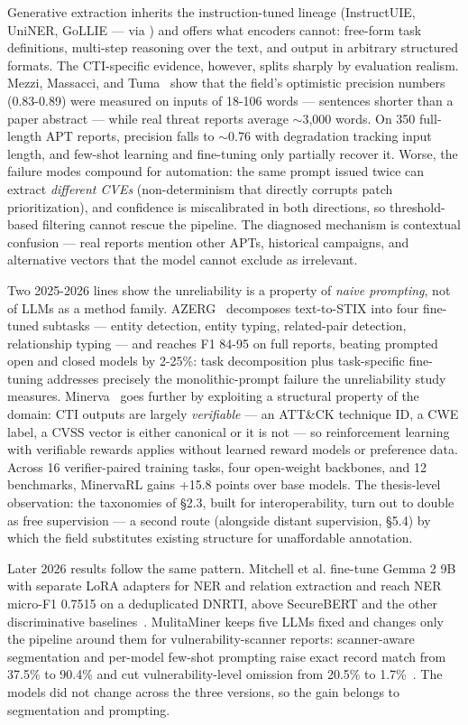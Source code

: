 \documentclass[11pt]{article}
\begin{document}
Generative extraction inherits the instruction-tuned lineage (InstructUIE, UniNER, GoLLIE — via \citealp{zaratiana2023gliner}) and offers what encoders cannot: free-form task definitions, multi-step reasoning over the text, and output in arbitrary structured formats. The CTI-specific evidence, however, splits sharply by evaluation realism. Mezzi, Massacci, and Tuma~\citep{mezzi2025large} show that the field's optimistic precision numbers (0.83-0.89) were measured on inputs of 18-106 words — sentences shorter than a paper abstract — while real threat reports average $\sim$3,000 words. On 350 full-length APT reports, precision falls to $\sim$0.76 with degradation tracking input length, and few-shot learning and fine-tuning only partially recover it. Worse, the failure modes compound for automation: the same prompt issued twice can extract \emph{different CVEs} (non-determinism that directly corrupts patch prioritization), and confidence is miscalibrated in both directions, so threshold-based filtering cannot rescue the pipeline. The diagnosed mechanism is contextual confusion — real reports mention other APTs, historical campaigns, and alternative vectors that the model cannot exclude as irrelevant.

Two 2025-2026 lines show the unreliability is a property of \emph{naive prompting}, not of LLMs as a method family. AZERG~\citep{lekssays2025text} decomposes text-to-STIX into four fine-tuned subtasks — entity detection, entity typing, related-pair detection, relationship typing — and reaches F1 84-95 on full reports, beating prompted open and closed models by 2-25\%: task decomposition plus task-specific fine-tuning addresses precisely the monolithic-prompt failure the unreliability study measures. Minerva~\citep{alam2026minerva} goes further by exploiting a structural property of the domain: CTI outputs are largely \emph{verifiable} — an ATT\&CK technique ID, a CWE label, a CVSS vector is either canonical or it is not — so reinforcement learning with verifiable rewards applies without learned reward models or preference data. Across 16 verifier-paired training tasks, four open-weight backbones, and 12 benchmarks, MinervaRL gains +15.8 points over base models. The thesis-level observation: the taxonomies of §2.3, built for interoperability, turn out to double as free supervision — a second route (alongside distant supervision, §5.4) by which the field substitutes existing structure for unaffordable annotation.

Later 2026 results follow the same pattern. Mitchell et al. fine-tune Gemma 2 9B with separate LoRA adapters for NER and relation extraction and reach NER micro-F1 0.7515 on a deduplicated DNRTI, above SecureBERT and the other discriminative baselines~\citep{mitchell2026lora}. MulitaMiner keeps five LLMs fixed and changes only the pipeline around them for vulnerability-scanner reports: scanner-aware segmentation and per-model few-shot prompting raise exact record match from 37.5\% to 90.4\% and cut vulnerability-level omission from 20.5\% to 1.7\%~\citep{machado2026mulitaminer}. The models did not change across the three versions, so the gain belongs to segmentation and prompting.
\end{document}
